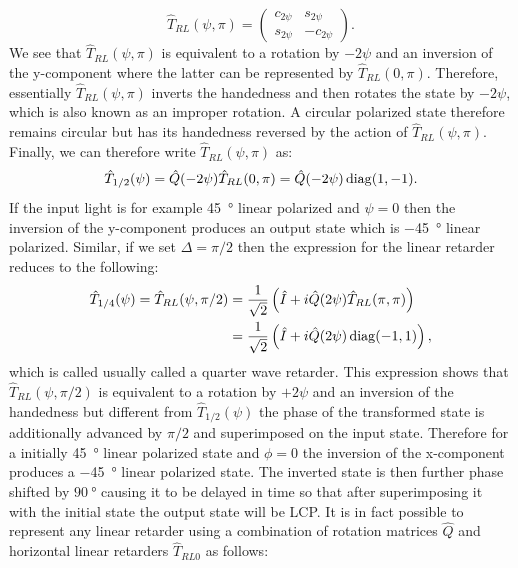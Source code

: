 \begin{equation}
    \hat{T}_{RL}(\psi, \pi)= 
    \begin{pmatrix} 
    c_{2\psi} & s_{2\psi} \\
    s_{2\psi} & -c_{2\psi}
    \end{pmatrix}.
\end{equation}
We see that $\hat{T}_{RL}(\psi, \pi)$ is equivalent to a rotation by $-2\psi$ and an inversion of the y-component where the latter can be represented by $\hat{T}_{RL}(0, \pi)$. Therefore, essentially $\hat{T}_{RL}(\psi, \pi)$ inverts the handedness and then rotates the state by $-2\psi$, which is also known as an improper rotation. A circular polarized state therefore remains circular but has its handedness reversed by the action of $\hat{T}_{RL}(\psi, \pi)$. Finally, we can therefore write $\hat{T}_{RL}(\psi, \pi)$ as:
\begin{equation}
    \hat{T}_{1/2}(\psi)=
    \hat{Q}(-2\psi)\hat{T}_{RL}(0, \pi)=\hat{Q}(-2\psi)\operatorname{diag}(1,-1).
\end{equation}
If the input light is for example \SI{+45}{\degree} linear polarized and $\psi=0$ then the inversion of the y-component produces an output state which is \SI{-45}{\degree} linear polarized.
Similar, if we set $\Delta=\pi/2$ then the expression for the linear retarder reduces to the following:
\begin{align}
\begin{split}
    \hat{T}_{1/4}(\psi)=\hat{T}_{RL}(\psi, \pi/2)
    &=\frac{1}{\sqrt{2}}\left(\hat{I}+i\hat{Q}(2\psi)\hat{T}_{RL}(\pi, \pi)\right)
    \\
    &=\frac{1}{\sqrt{2}}\left(\hat{I}+i\hat{Q}(2\psi)\operatorname{diag}(-1,1)\right),
\end{split}
\end{align}
which is called usually called a quarter wave retarder. This expression shows that $\hat{T}_{RL}(\psi, \pi/2)$ is equivalent to a rotation by $+2\psi$ and an inversion of the handedness but different from $\hat{T}_{1/2}(\psi)$ the phase of the transformed state is additionally advanced by $\pi/2$ and superimposed on the input state. Therefore for a initially \SI{+45}{\degree} linear polarized state and $\phi=0$ the inversion of the x-component produces a \SI{-45}{\degree} linear polarized state. The inverted state is then further phase shifted by $\SI{+90}{\degree}$ causing it to be delayed in time so that after superimposing it with the initial state the output state will be LCP. It is in fact possible to represent any linear retarder using a combination of rotation matrices $\hat{Q}$ and horizontal linear retarders $\hat{T}_{RL0}$ as follows:
